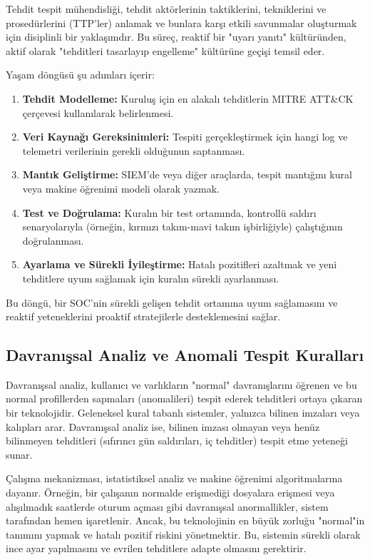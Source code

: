 Tehdit tespit mühendisliği, tehdit aktörlerinin taktiklerini, tekniklerini ve prosedürlerini (TTP'ler) anlamak ve bunlara karşı etkili savunmalar oluşturmak için disiplinli bir yaklaşımdır. Bu süreç, reaktif bir "uyarı yanıtı" kültüründen, aktif olarak "tehditleri tasarlayıp engelleme" kültürüne geçişi temsil eder.

Yaşam döngüsü şu adımları içerir:
\begin{enumerate}
    \item \textbf{Tehdit Modelleme:} Kuruluş için en alakalı tehditlerin MITRE ATT\&CK çerçevesi kullanılarak belirlenmesi.
    \item \textbf{Veri Kaynağı Gereksinimleri:} Tespiti gerçekleştirmek için hangi log ve telemetri verilerinin gerekli olduğunun saptanması.
    \item \textbf{Mantık Geliştirme:} SIEM'de veya diğer araçlarda, tespit mantığını kural veya makine öğrenimi modeli olarak yazmak.
    \item \textbf{Test ve Doğrulama:} Kuralın bir test ortamında, kontrollü saldırı senaryolarıyla (örneğin, kırmızı takım-mavi takım işbirliğiyle) çalıştığının doğrulanması.
    \item \textbf{Ayarlama ve Sürekli İyileştirme:} Hatalı pozitifleri azaltmak ve yeni tehditlere uyum sağlamak için kuralın sürekli ayarlanması.
\end{enumerate}

Bu döngü, bir SOC'nin sürekli gelişen tehdit ortamına uyum sağlamasını ve reaktif yeteneklerini proaktif stratejilerle desteklemesini sağlar.

\subsection{Davranışsal Analiz ve Anomali Tespit Kuralları}

Davranışsal analiz, kullanıcı ve varlıkların "normal" davranışlarını öğrenen ve bu normal profillerden sapmaları (anomalileri) tespit ederek tehditleri ortaya çıkaran bir teknolojidir. Geleneksel kural tabanlı sistemler, yalnızca bilinen imzaları veya kalıpları arar. Davranışsal analiz ise, bilinen imzası olmayan veya henüz bilinmeyen tehditleri (sıfırıncı gün saldırıları, iç tehditler) tespit etme yeteneği sunar.

Çalışma mekanizması, istatistiksel analiz ve makine öğrenimi algoritmalarına dayanır. Örneğin, bir çalışanın normalde erişmediği dosyalara erişmesi veya alışılmadık saatlerde oturum açması gibi davranışsal anormallikler, sistem tarafından hemen işaretlenir. Ancak, bu teknolojinin en büyük zorluğu "normal"in tanımını yapmak ve hatalı pozitif riskini yönetmektir. Bu, sistemin sürekli olarak ince ayar yapılmasını ve evrilen tehditlere adapte olmasını gerektirir.

